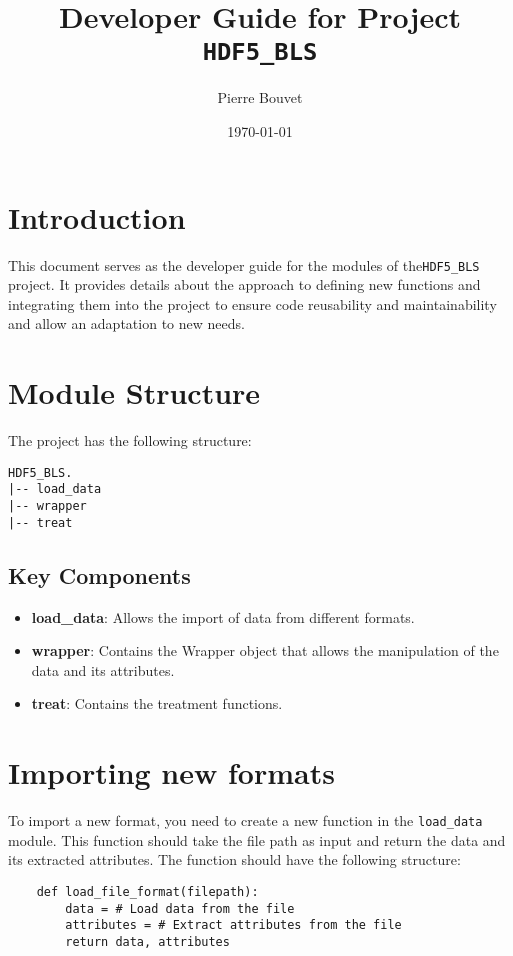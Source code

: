 \documentclass[a4paper,12pt]{article}
\title{Developer Guide for Project \texttt{HDF5\_BLS}}
\author{Pierre Bouvet}
\date{\today}
\begin{document}
\maketitle

\section{Introduction}
This document serves as the developer guide for the modules of the\texttt{HDF5\_BLS} project. It provides details about the approach to defining new functions and integrating them into the project to ensure code reusability and maintainability and allow an adaptation to new needs.

\section{Module Structure}
The project has the following structure:
\begin{verbatim}
HDF5_BLS.
|-- load_data
|-- wrapper
|-- treat
\end{verbatim}

\subsection{Key Components}
\begin{itemize}
    \item \textbf{load\_data}: Allows the import of data from different formats.
    \item \textbf{wrapper}: Contains the Wrapper object that allows the manipulation of the data and its attributes.
    \item \textbf{treat}: Contains the treatment functions.
\end{itemize}

\section{Importing new formats}
To import a new format, you need to create a new function in the \texttt{load\_data} module. This function should take the file path as input and return the data and its extracted attributes. The function should have the following structure:
\begin{verbatim}
    def load_file_format(filepath):
        data = # Load data from the file
        attributes = # Extract attributes from the file
        return data, attributes
\end{verbatim}
\end{document}
